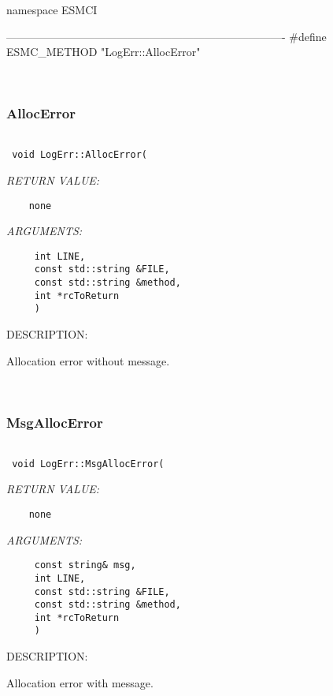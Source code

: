  namespace ESMCI{
 
  ----------------------------------------------------------------------------
 #define ESMC_METHOD "LogErr::AllocError" 
 
\mbox{}\hrulefill\ 
 
\subsubsection [AllocError] {AllocError}


  
\begin{verbatim} 
 
 void LogErr::AllocError(
 \end{verbatim}{\em RETURN VALUE:}
\begin{verbatim}    none\end{verbatim}{\em ARGUMENTS:}
\begin{verbatim}     int LINE,
     const std::string &FILE,
     const std::string &method,
     int *rcToReturn
     )\end{verbatim}
{\sf DESCRIPTION:\\ }


      Allocation error without message. 
 
\mbox{}\hrulefill\ 
 
\subsubsection [MsgAllocError] {MsgAllocError}


  
\begin{verbatim} 
 
 void LogErr::MsgAllocError(
 \end{verbatim}{\em RETURN VALUE:}
\begin{verbatim}    none\end{verbatim}{\em ARGUMENTS:}
\begin{verbatim}     const string& msg,
     int LINE,
     const std::string &FILE,
     const std::string &method,
     int *rcToReturn
     )\end{verbatim}
{\sf DESCRIPTION:\\ }


      Allocation error with message. 
 
}
